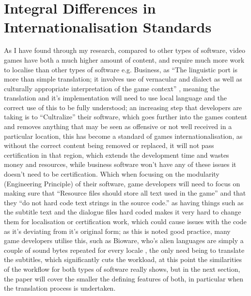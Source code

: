 \documentclass{scrartcl}
\begin{document}
\section{Integral Differences in Internationalisation Standards}
As I have found through my research, compared to other types of software, video games have both a much higher amount of content, and require much more work to localise than other types of software e.g. Business, as ``The linguistic port is more than simple translation; it involves use of vernacular and dialect as well as culturally appropriate interpretation of the game context'' \cite[pg.1]{losavio2014linguistic}, meaning the translation and it's implementation will need to use local language and the correct use of this to be fully understood; an increasing step that developers are taking is to ``Cultralize'' their software\cite[pg.4]{bestpractices}, which goes further into the games content and removes anything that may be seen as offensive or not well received in a particular location, this has become a standard of games internationalisation, as without the correct content being removed or replaced, it will not pass certification in that region, which extends the development time and wastes money and resources, while business software won't have any of these issues it doesn't need to be certification. Which when focusing on the modularity (Engineering Principle) of their software, game developers will need to focus on making sure that ``Resource files should store all text used in the game'' and that they ``do not hard code text strings in the source code.''\cite[pg.24]{bestpractices} as having things such as the subtitle text and the dialogue files hard coded makes it very hard to change them for localisation or certification work, which could cause issues with the code as it's deviating from it's original form; as this is noted good practice, many game developers utilise this, such as Bioware, who's alien languages are simply a couple of sound bytes repeated for every locale \cite[pg.1]{losavio2014linguistic}, the only need being to translate the subtitles, which significantly cuts the workload, at this point the similarities of the workflow for both types of software really shows, but in the next section, the paper will cover the smaller the defining features of both, in particular when the translation process is undertaken.
\end{document}
